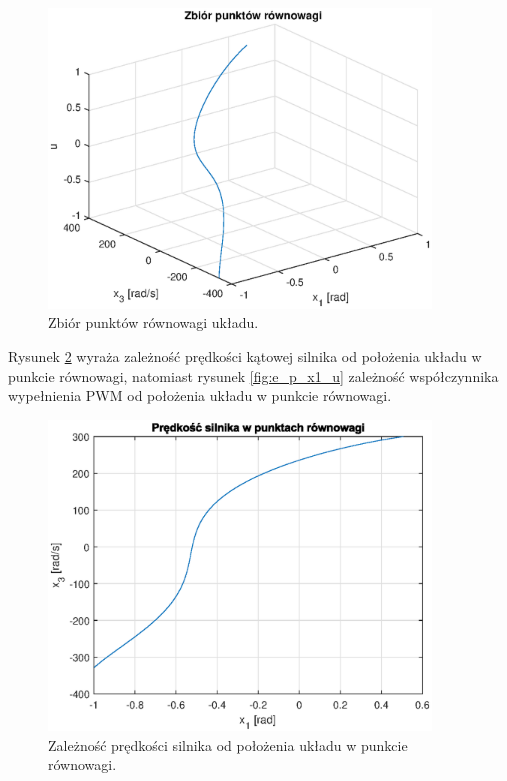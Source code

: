 \documentclass[11pt,a4paper]{article}
\begin{document}
\begin{figure}[H]
	\centering
	\includegraphics[width=4in]{Figures/e_p_3d.eps}
	\caption{Zbiór punktów równowagi układu.}
	\label{fig:e_p_3d}
\end{figure}

Rysunek \ref{fig:e_p_x1_x3} wyraża zależność prędkości kątowej silnika od położenia układu w punkcie równowagi, natomiast rysunek \ref{fig:e_p_x1_u} zależność współczynnika wypełnienia PWM od położenia układu w punkcie równowagi.

\begin{figure}[H]
	\centering
	\includegraphics[width=4in]{Figures/e_p_x1_x3.eps}
	\caption{Zależność prędkości silnika od położenia układu w punkcie równowagi.}
	\label{fig:e_p_x1_x3}
\end{figure}
\end{document}
